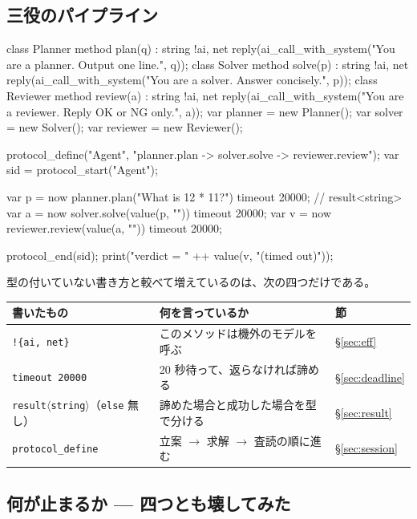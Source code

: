 \documentclass[11pt,a4paper]{ltjsarticle}
\theoremstyle{definition}
\theoremstyle{remark}
\begin{document}
\subsection{三役のパイプライン}

\begin{aipl}
class Planner {
  method plan(q) : string !{ai, net} {
    reply(ai_call_with_system("You are a planner. Output one line.", q));
  }
}
class Solver {
  method solve(p) : string !{ai, net} {
    reply(ai_call_with_system("You are a solver. Answer concisely.", p));
  }
}
class Reviewer {
  method review(a) : string !{ai, net} {
    reply(ai_call_with_system("You are a reviewer. Reply OK or NG only.", a));
  }
}
var planner  = new Planner();
var solver   = new Solver();
var reviewer = new Reviewer();

protocol_define("Agent", "planner.plan -> solver.solve -> reviewer.review");
var sid = protocol_start("Agent");

var p = now planner.plan("What is 12 * 11?") timeout 20000;   // result<string>
var a = now solver.solve(value(p, "")) timeout 20000;
var v = now reviewer.review(value(a, "")) timeout 20000;

protocol_end(sid);
print("verdict = " ++ value(v, "(timed out)"));
\end{aipl}

型の付いていない書き方と較べて増えているのは、次の四つだけである。

\begin{center}
\begin{tabular}{lll}
\toprule
書いたもの & 何を言っているか & 節 \\
\midrule
\texttt{!\{ai, net\}} & このメソッドは機外のモデルを呼ぶ & \S\ref{sec:eff} \\
\texttt{timeout 20000} & 20 秒待って、返らなければ諦める & \S\ref{sec:deadline} \\
\texttt{result}$\langle$\texttt{string}$\rangle$（\texttt{else} 無し） & 諦めた場合と成功した場合を型で分ける & \S\ref{sec:result} \\
\texttt{protocol\_define} & 立案 $\to$ 求解 $\to$ 査読の順に進む & \S\ref{sec:session} \\
\bottomrule
\end{tabular}
\end{center}

\subsection{何が止まるか --- 四つとも壊してみた}
\end{document}
